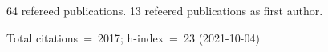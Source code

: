 64 refereed publications. 13 refeered publications as first author.

Total citations~=~2017; h-index~=~23 (2021-10-04)